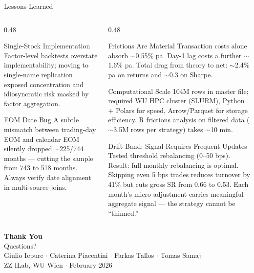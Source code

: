 \documentclass[
  ignorenonframetext,
  aspectratio=169]{beamer}
\begin{document}
\begin{frame}{Lessons Learned}
\label{lessons-learned-1}
\begin{columns}[T]
\begin{column}{0.48\textwidth}
\begin{block}{Single-Stock Implementation}
Factor-level backtests overstate implementability; moving to single-name replication exposed concentration and idiosyncratic risk masked by factor aggregation.
\end{block}

\begin{block}{EOM Date Bug}
A subtle mismatch between trading-day EOM and calendar EOM silently dropped $\sim$225/744 months --- cutting the sample from 743 to 518 months. Always verify date alignment in multi-source joins.
\end{block}
\end{column}
\begin{column}{0.48\textwidth}
\begin{block}{Frictions Are Material}
Transaction costs alone absorb $\sim$0.55\% pa. Day-1 lag costs a further $\sim$1.6\% pa. Total drag from theory to net: $\sim$2.4\% pa on returns and $\sim$0.3 on Sharpe.
\end{block}
\begin{block}{Computational Scale}
104M rows in master file; required WU HPC cluster (SLURM), Python + Polars for speed, Arrow/Parquet for storage efficiency. R frictions analysis on filtered data ($\sim$3.5M rows per strategy) takes $\sim$10 min.
\end{block}
\begin{block}{Drift-Band: Signal Requires Frequent Updates}
Tested threshold rebalancing (0--50 bps). Result: full monthly rebalancing is optimal. Skipping even 5 bps trades reduces turnover by 41\% but cuts gross SR from 0.66 to 0.53. Each month's micro-adjustment carries meaningful aggregate signal --- the strategy cannot be ``thinned.''
\end{block}
\end{column}
\end{columns}
\end{frame}

\begin{frame}
\begin{center}
\vspace{1cm}
{\Huge \textbf{Thank You}}\\[1em]
{\large Questions?}\\[2em]
{\normalsize Giulio Iepure $\cdot$ Caterina Piacentini $\cdot$ Farkas Tallos $\cdot$ Tomas Samaj}\\[0.5em]
{\small ZZ ILab, WU Wien $\cdot$ February 2026}
\end{center}

\appendix
\end{frame}
\end{document}
